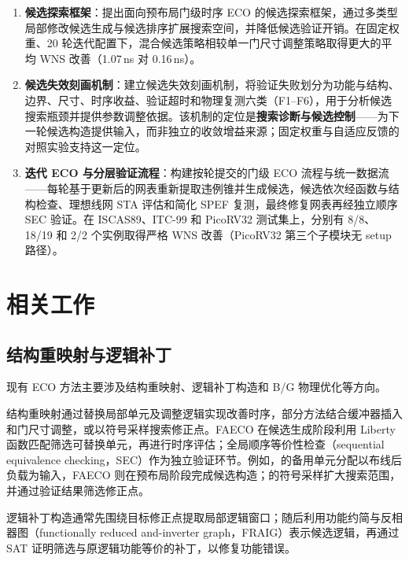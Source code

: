 \documentclass[twocolumn,10pt,fontset=windows]{ctexart}
\begin{document}
\begin{enumerate}
  \item \textbf{候选探索框架}：提出面向预布局门级时序 ECO 的候选探索框架，通过多类型局部修改候选生成与候选排序扩展搜索空间，并降低候选验证开销。在固定权重、20 轮迭代配置下，混合候选策略相较单一门尺寸调整策略取得更大的平均 WNS 改善（1.07\,ns 对 0.16\,ns）。
  \item \textbf{候选失效刻画机制}：建立候选失效刻画机制，将验证失败划分为功能与结构、边界、尺寸、时序收益、验证超时和物理复测六类（F1--F6），用于分析候选搜索瓶颈并提供参数调整依据。该机制的定位是\textbf{搜索诊断与候选控制}——为下一轮候选构造提供输入，而非独立的收敛增益来源；固定权重与自适应反馈的对照实验支持这一定位。
  \item \textbf{迭代 ECO 与分层验证流程}：构建按轮提交的门级 ECO 流程与统一数据流——每轮基于更新后的网表重新提取违例锥并生成候选，候选依次经函数与结构检查、理想线网 STA 评估和简化 SPEF 复测，最终修复网表再经独立顺序 SEC 验证。在 ISCAS89、ITC-99 和 PicoRV32 测试集上，分别有 8/8、18/19 和 2/2 个实例取得严格 WNS 改善（PicoRV32 第三个子模块无 setup 路径）。
\end{enumerate}

\section{相关工作}

\subsection{结构重映射与逻辑补丁}
现有 ECO 方法主要涉及结构重映射、逻辑补丁构造和 B/G 物理优化等方向。

结构重映射通过替换局部单元及调整逻辑实现改善时序，部分方法结合缓冲器插入和门尺寸调整\cite{ho2010eco}，或以符号采样搜索修正点\cite{kravets2019symbolic}。FAECO 在候选生成阶段利用 Liberty 函数匹配筛选可替换单元，再进行时序评估；全局顺序等价性检查（sequential equivalence checking，SEC）作为独立验证环节。例如，\cite{ho2010eco}的备用单元分配以布线后负载为输入，FAECO 则在预布局阶段完成候选构造；\cite{kravets2019symbolic}的符号采样扩大搜索范围，并通过验证结果筛选修正点。

逻辑补丁构造通常先围绕目标修正点提取局部逻辑窗口；随后利用功能约简与反相器图（functionally reduced and-inverter graph，FRAIG）表示候选逻辑，再通过 SAT 证明筛选与原逻辑功能等价的补丁，以修复功能错误\cite{jiang2010fraig,jiang2016resource}。
\end{document}
